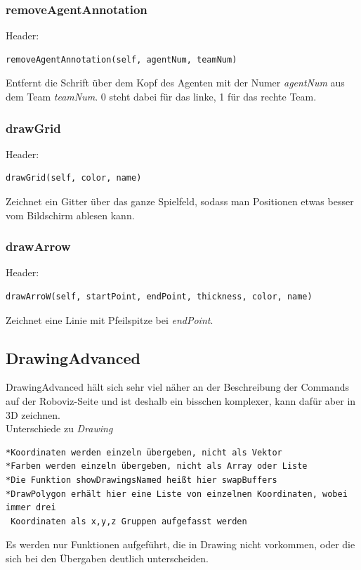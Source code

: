 \subsubsection*{removeAgentAnnotation}
Header:

\begin{verbatim}removeAgentAnnotation(self, agentNum, teamNum)
\end{verbatim}
Entfernt die Schrift über dem Kopf des Agenten mit der Numer \textit{agentNum} aus dem Team \textit{teamNum}.
0 steht dabei für das linke, 1 für das rechte Team.

\subsubsection*{drawGrid}
Header:

\begin{verbatim}drawGrid(self, color, name)
\end{verbatim}
Zeichnet ein Gitter über das ganze Spielfeld, sodass man Positionen etwas besser vom Bildschirm ablesen kann.

\subsubsection*{drawArrow}
Header:

\begin{verbatim}drawArroW(self, startPoint, endPoint, thickness, color, name)
\end{verbatim}
Zeichnet eine Linie mit Pfeilspitze bei \textit{endPoint}.

\subsection*{DrawingAdvanced}
DrawingAdvanced hält sich sehr viel näher an der Beschreibung der Commands auf der Roboviz-Seite und ist deshalb ein bisschen komplexer, kann dafür aber in 3D zeichnen.\\
Unterschiede zu \textit{Drawing}

\begin{verbatim}*Koordinaten werden einzeln übergeben, nicht als Vektor
*Farben werden einzeln übergeben, nicht als Array oder Liste
*Die Funktion showDrawingsNamed heißt hier swapBuffers
*DrawPolygon erhält hier eine Liste von einzelnen Koordinaten, wobei immer drei 
 Koordinaten als x,y,z Gruppen aufgefasst werden
\end{verbatim}
Es werden nur Funktionen aufgeführt, die in Drawing nicht vorkommen, oder die sich bei den Übergaben deutlich unterscheiden.

